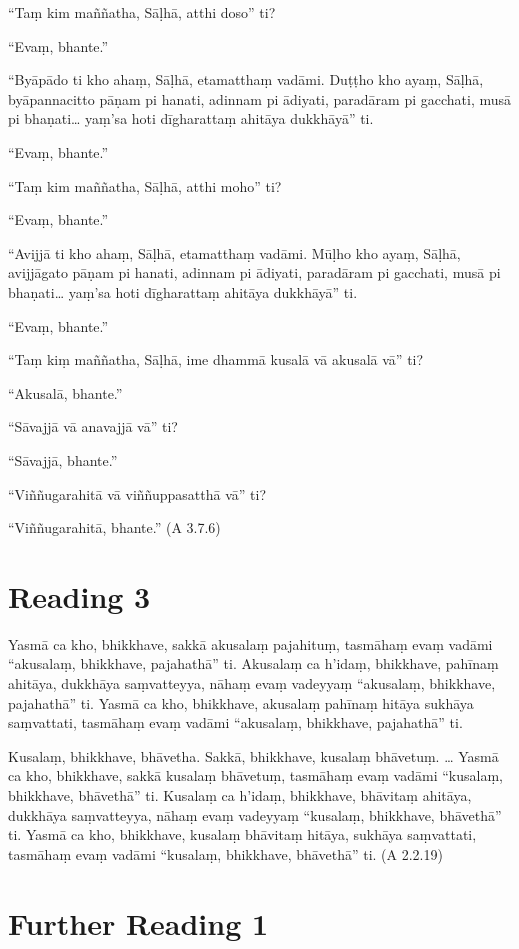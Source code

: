 “Taṃ kim maññatha, Sāḷhā, atthi doso” ti?

“Evaṃ, bhante.”

“Byāpādo ti kho ahaṃ, Sāḷhā, etamatthaṃ vadāmi. Duṭṭho kho ayaṃ, Sāḷhā, byāpannacitto pāṇam pi hanati, adinnam pi ādiyati, paradāram pi gacchati, musā pi bhaṇati… yaṃ’sa hoti dīgharattaṃ ahitāya dukkhāyā” ti.

“Evaṃ, bhante.”

“Taṃ kim maññatha, Sāḷhā, atthi moho” ti?

“Evaṃ, bhante.”

“Avijjā ti kho ahaṃ, Sāḷhā, etamatthaṃ vadāmi. Mūḷho kho ayaṃ, Sāḷhā, avijjāgato pāṇam pi hanati, adinnam pi ādiyati, paradāram pi gacchati, musā pi bhaṇati… yaṃ’sa hoti dīgharattaṃ ahitāya dukkhāyā” ti.

“Evaṃ, bhante.”

“Taṃ kiṃ maññatha, Sāḷhā, ime dhammā kusalā vā akusalā vā” ti?

“Akusalā, bhante.”

“Sāvajjā vā anavajjā vā” ti?

“Sāvajjā, bhante.”

“Viññugarahitā vā viññuppasatthā vā” ti?

“Viññugarahitā, bhante.” (A 3.7.6)

\section*{Reading 3}

Yasmā ca kho, bhikkhave, sakkā akusalaṃ pajahituṃ, tasmāhaṃ evaṃ vadāmi “akusalaṃ, bhikkhave, pajahathā” ti. Akusalaṃ ca h’idaṃ, bhikkhave, pahīnaṃ ahitāya, dukkhāya saṃvatteyya, nāhaṃ evaṃ vadeyyaṃ “akusalaṃ, bhikkhave, pajahathā” ti. Yasmā ca kho, bhikkhave, akusalaṃ pahīnaṃ hitāya sukhāya saṃvattati, tasmāhaṃ evaṃ vadāmi “akusalaṃ, bhikkhave, pajahathā” ti.

Kusalaṃ, bhikkhave, bhāvetha. Sakkā, bhikkhave, kusalaṃ bhāvetuṃ. … Yasmā ca kho, bhikkhave, sakkā kusalaṃ bhāvetuṃ, tasmāhaṃ evaṃ vadāmi “kusalaṃ, bhikkhave, bhāvethā” ti. Kusalaṃ ca h’idaṃ, bhikkhave, bhāvitaṃ ahitāya, dukkhāya saṃvatteyya, nāhaṃ evaṃ vadeyyaṃ “kusalaṃ, bhikkhave, bhāvethā” ti. Yasmā ca kho, bhikkhave, kusalaṃ bhāvitaṃ hitāya, sukhāya saṃvattati, tasmāhaṃ evaṃ vadāmi “kusalaṃ, bhikkhave, bhāvethā” ti. (A 2.2.19)

\section*{Further Reading 1}

